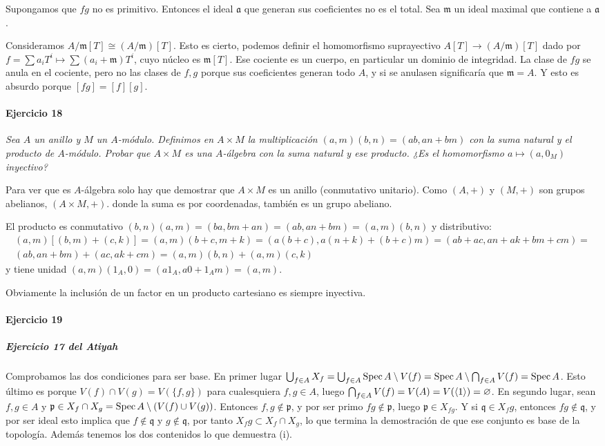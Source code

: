 \documentclass[../main.tex]{subfiles}
\begin{document}
Supongamos que $fg$ no es primitivo. Entonces el ideal $\mathfrak a$ que generan sus coeficientes no es el total. Sea $\mathfrak m$ un ideal maximal que contiene a $\mathfrak a$.

Consideramos $A/\mathfrak m [T] \cong (A/\mathfrak m)[T]$. Esto es cierto, podemos definir el homomorfismo suprayectivo $A[T] \to (A/\mathfrak m)[T]$ dado por $f= \sum a_iT^i \mapsto \sum (a_i+\mathfrak m) T^i$, cuyo núcleo es $\mathfrak m[T]$. Ese cociente es un cuerpo, en particular un dominio de integridad. La clase de $fg$ se anula en el cociente, pero no las clases de $f, g$ porque sus coeficientes generan todo $A$, y si se anulasen significaría que $\mathfrak m = A$. Y esto es absurdo porque $[fg] = [f][g]$.

\paragraph{Ejercicio 18} \textit{Sea $A$ un anillo y $M$ un $A$-módulo. Definimos en $A\times M$ la multiplicación $(a,m)(b,n) = (ab,an+bm)$ con la suma natural y el producto de $A$-módulo. Probar que $A\times M$ es una $A$-álgebra con la suma natural y ese producto. ¿Es el homomorfismo $a\mapsto (a,0_M)$ inyectivo?}

Para ver que es $A$-álgebra solo hay que demostrar que $A\times M$ es un anillo (conmutativo unitario). Como $(A,+)$ y $(M,+)$ son grupos abelianos, $(A\times M, +)$. donde la suma es por coordenadas, también es un grupo abeliano.

El producto es conmutativo $(b,n)(a,m) = (ba,bm+an) = (ab,an+bm) = (a,m)(b,n)$ y distributivo:
\begin{multline}
  (a,m)[(b,m)+(c,k)]=(a,m)(b+c,m+k) = \left(a(b+c),a(n+k)+(b+c)m\right) = (ab+ac,an+ak+bm+cm) =\\ (ab,an+bm)+(ac,ak+cm) = (a,m)(b,n)+(a,m)(c,k)
\end{multline}
y tiene unidad $(a,m)(1_A,0) = (a1_A,a0+1_A m) = (a,m)$.


Obviamente la inclusión de un factor en un producto cartesiano es siempre inyectiva.

\paragraph{Ejercicio 19}

\subparagraph{Ejercicio 17 del Atiyah}

Comprobamos las dos condiciones para ser base. En primer lugar $\bigcup_{f\in A}X_f = \bigcup_{f\in A}\operatorname{Spec} A \setminus V(f) = \operatorname{Spec} A \setminus \bigcap_{f\in A}V(f) = \operatorname{Spec} A$. Esto último es porque $V(f)\cap V(g) = V(\{f,g\})$ para cualesquiera $f,g \in A$, luego $\bigcap_{f\in A}V(f) = V(A) = V(\langle 1 \rangle) = \varnothing$. En segundo lugar, sean $f, g \in A$ y $\mathfrak p \in X_f\cap X_g = \operatorname{Spec} A \setminus (V(f) \cup V(g))$. Entonces $f, g\not\in \mathfrak p$, y por ser primo $fg \not \in \mathfrak p$, luego $\mathfrak p \in X_{fg}$. Y si $\mathfrak q \in X_fg$, entonces $fg \not \in \mathfrak q$, y por ser ideal esto implica que $f \not \in \mathfrak q$ y $g \not \in \mathfrak q$, por tanto $X_fg \subset X_f \cap X_g$, lo que termina la demostración de que ese conjunto es base de la topología. Además tenemos los dos contenidos lo que demuestra (i).
\end{document}
